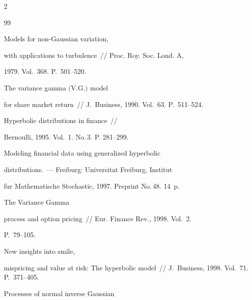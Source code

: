\begin{multicols}{2}
{{\begin{thebibliography}{99}


 Models for non-Gaussian variation,


with applications to turbulence~// Proc. Roy. Soc. Lond. A,


1979. Vol.~368. P.~501--520.







 The variance gamma $($V.G.$)$ model


for share market return~// J.~Business, 1990. Vol.~63. P.~511--524.







 Hyperbolic distributions in finance~//


Bernoulli, 1995. Vol.~1. No.\,3. P. 281--299.







 Modeling financial data using generalized hyperbolic


distributions.~--- Freiburg: Universit$\ddot{\mbox{a}}$t Freiburg, Institut


f$\ddot{\mbox{u}}$r Mathematische Stochastic, 1997. Preprint No.\,48. 14~p.







 The Variance Gamma


process and option pricing~// Eur. Finance Rev., 1998. Vol.~2.


P.~79--105.







 New insights into smile,


mispricing and value at risk: The hyperbolic model~// J.~Business, 1998. Vol.~71. P.~371--405.







 Processes of normal inverse Gaussian



\end{thebibliography}}}
\end{multicols}
